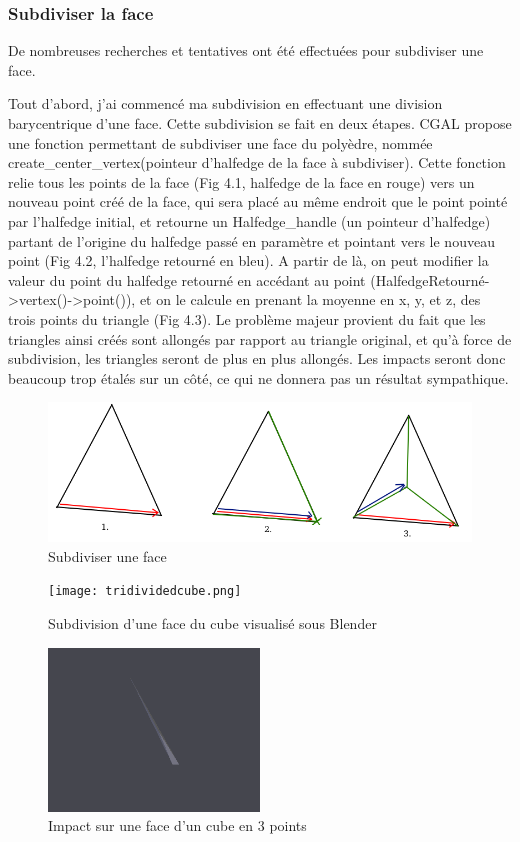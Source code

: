 \documentclass[a4paper,french]{report}
\begin{document}
				\subsubsection{Subdiviser la face}
					De nombreuses recherches et tentatives ont été effectuées pour subdiviser une face. \par
					Tout d'abord, j'ai commencé ma subdivision en effectuant une division barycentrique d'une face. Cette subdivision se fait en deux étapes. CGAL propose une fonction permettant de subdiviser une face du polyèdre, nommée create\_center\_vertex(pointeur d'halfedge de la face à subdiviser). Cette fonction relie tous les points de la face (Fig 4.1, halfedge de la face en rouge) vers un nouveau point créé de la face, qui sera placé au même endroit que le point pointé par l'halfedge initial, et retourne un Halfedge\_handle (un pointeur d'halfedge) partant de l'origine du halfedge passé en paramètre et pointant vers le nouveau point (Fig 4.2, l'halfedge retourné en bleu). A partir de là, on peut modifier la valeur du point du halfedge retourné en accédant au point (HalfedgeRetourné-\textgreater vertex()-\textgreater point()), et on le calcule en prenant la moyenne en x, y, et z, des trois points du triangle (Fig 4.3). Le problème majeur provient du fait que les triangles ainsi créés sont allongés par rapport au triangle original, et qu'à force de subdivision, les triangles seront de plus en plus allongés. Les impacts seront donc beaucoup trop étalés sur un côté, ce qui ne donnera pas un résultat sympathique. \par 
					\begin{figure}[h]
						\centering
						\includegraphics[width=1\textwidth]{FigBarycentricMesh.png}
						\caption{Subdiviser une face}
					\end{figure}
					\begin{figure}[h]
						\centering
						\texttt{[image: tridividedcube.png]}
						\caption{Subdivision d'une face du cube visualisé sous Blender}
					\end{figure}
					\begin{figure}[h]
						\centering
						\includegraphics[width=0.5\textwidth]{impact1.png}
						\caption{Impact sur une face d'un cube en 3 points}
					\end{figure}
\end{document}
